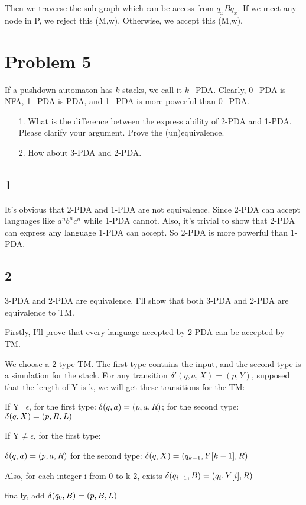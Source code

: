 \documentclass[a4paper,UTF8]{ctexart}
\theoremstyle{definition}
\begin{document}
Then we traverse the sub-graph which can be access from $q_xBq_x$. If we meet any node in P,
we reject this (M,w). Otherwise, we accept this (M,w).

\newpage

\section*{Problem 5}
If a pushdown automaton has $k$ stacks, we call it $k$−PDA. Clearly, 0−PDA is NFA, 1−PDA is PDA, and 1−PDA is more powerful than 0−PDA.
\begin{enumerate}
  \item[1.] What is the difference between the express ability of 2-PDA and 1-PDA. Please clarify your argument. Prove the (un)equivalence.
  \item[2.] How about 3-PDA and 2-PDA.
\end{enumerate}

\subsection*{1}
It's obvious that 2-PDA and 1-PDA are not equivalence. Since 2-PDA can accept languages like $a^nb^nc^n$
while 1-PDA cannot. Also, it's trivial to show that 2-PDA can express any language 1-PDA can accept.
So 2-PDA is more powerful than 1-PDA.

\subsection*{2}
3-PDA and 2-PDA are equivalence.
I'll show that both 3-PDA and 2-PDA are equivalence to TM.

Firstly, I'll prove that every language accepted by 2-PDA can be accepted by TM.

We choose a 2-type TM. The first type contains the input, and the second type is a simulation for the stack.
For any transition $\delta'(q,a,X)=(p,Y)$, supposed that the length of 
Y is k, we will get these transitions for the TM:

If Y=$\epsilon$, for the first type: $\delta(q,a)=(p,a,R)$; 
for the second type: $\delta(q,X)=(p,B,L)$

If Y$\ne \epsilon$, for the first type:

$\delta(q,a)=(p,a,R)$
for the second type: $\delta(q,X)=(q_{k-1},Y[k-1],R)$

Also, for each integer i from 0 to k-2, exists $\delta(q_{i+1},B)=(q_{i},Y[i],R)$

finally, add $\delta(q_0,B)=(p,B,L)$
\end{document}
